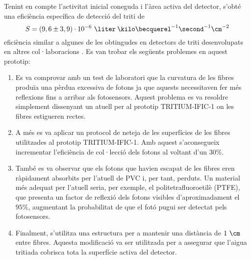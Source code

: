 Tenint en compte l'activitat inicial coneguda i l'àrea activa del detector, s'obté una eficiència específica de detecció del triti de
$$S = (9,6 \pm 3,9)\cdot{} 10^{-6}~\liter\:\kilo\becquerel^{-1}\second^{-1}\cm^{-2}$$
eficiència similar a algunes de les obtingudes en detectors de triti desenvolupats en altres col·laboracions \cite{Muramatsu, Moghissi}. Es van trobar els següents problemes en aquest prototip:

\begin{enumerate}
\item{} Es va comprovar amb un test de laboratori que la curvatura de les fibres produïa una pèrdua excessiva de fotons ja que aquests necessitaven fer més reflexions fins a arribar als fotosensors. Aquest problema es va resoldre simplement dissenyant un atuell per al prototip TRITIUM-IFIC-1 on les fibres estigueren rectes.

\item{} A més es va aplicar un protocol de neteja de les superfícies de les fibres utilitzades al prototip TRITIUM-IFIC-1. Amb aquest s'aconsegueix incrementar l'eficiència de col·lecció dels fotons al voltant d'un $30\%$.

\item{} També es va observar que els fotons que havien escapat de les fibres eren ràpidament absorbits per l'atuell de PVC i, per tant, perduts. Un material més adequat per l'atuell seria, per exemple, el politetrafluoroetilè (PTFE), que presenta un factor de reflexió dels fotons visibles d'aproximadament el $95\%$, augmentant la probabilitat de que el fotó pugui ser detectat pels fotosensors.

\item{} Finalment, s'utilitza una estructura per a mantenir una distància de $1~\cm$ entre fibres. Aquesta modificació va ser utilitzada per a assegurar que l'aigua tritiada cobrisca tota la superfície activa del detector.

\end{enumerate}

